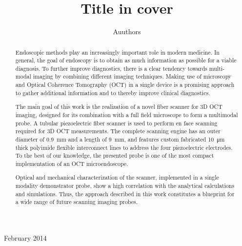 \documentclass[10pt]{iopart}
\begin{document}
\title[Title on header]{Title in cover}

\author{Auuthors}

\address{Address}
\vspace{10pt}
\begin{indented}
\item[]February 2014
\end{indented}

\begin{abstract}
Endoscopic methods play an increasingly important role in modern medicine. In general, the goal of endoscopy is to obtain as much information as possible for a viable diagnosis. To further improve diagnostics, there is a clear tendency towards multi-modal imaging by combining different imaging techniques. Making use of microscopy and Optical Coherence Tomography (OCT) in a single device is a promising approach to gather additional information and to thereby improve clinical diagnostics. 

The main goal of this work is the realization of a novel fiber scanner for 3D OCT imaging, designed for its combination with a full field microscope to form a multimodal probe. A tubular piezoelectric fiber scanner is used to perform en face scanning required for 3D OCT measurements. The complete scanning engine has an outer diameter of \SI{0.9}{\milli\meter} and a length of \SI{9}{\milli\meter}, and features custom fabricated \SI{10}{\micro\meter} thick polyimide flexible interconnect lines to address the four piezoelectric electrodes. To the best of our knowledge, the presented probe is one of the most compact implementation of an OCT microendoscope.

Optical and mechanical characterization of the scanner, implemented in a single modality demonstrator probe, show a high correlation with the analytical calculations and simulations. Thus, the approach described in this work constitutes a blueprint for a wide range of future scanning imaging probes.

\end{abstract}
%
%
%
% 
\ioptwocol
%
\end{document}
